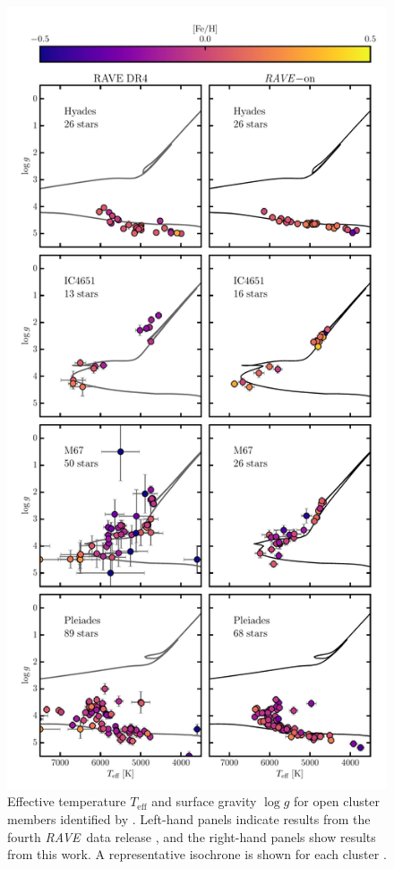 \documentclass[preprint]{aastex}
\newcommand{\acronym}[1]{{\small{#1}}}
\newcommand{\project}[1]{\textsl{#1}}
\newcommand{\rave}{\project{\acronym{RAVE}}}
\newcommand{\teff}{T_{\mathrm{eff}}}
\newcommand{\logg}{\log g}
\begin{document}
\begin{figure}[p]
\center
\includegraphics[height=\textheight]{figures/open-clusters.pdf}
\caption{Effective temperature $\teff$ and surface gravity $\logg$ for open cluster members identified by \citep{Kunder_2016}.  Left-hand panels indicate results from the fourth \rave\ data release \citep{Kordopatis_2013}, and the right-hand panels show results from this work.  A representative isochrone is shown for each cluster \citep{Bressan_2012}.\label{fig:open-cluster-HRD}}
\end{figure}
\end{document}
